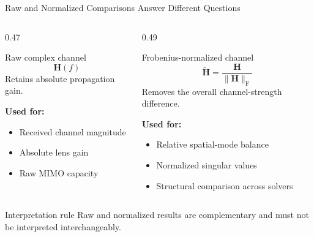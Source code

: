 \begin{frame}[t,shrink=20]{Raw and Normalized Comparisons Answer Different Questions}
    \begin{columns}[T,onlytextwidth]
        \begin{column}{0.47\textwidth}
            \begin{block}{Raw complex channel}
                \[
                    \mathbf H(f)
                \]
                Retains absolute propagation gain.

                \vspace{2mm}
                \textbf{Used for:}
                \begin{itemize}
                    \item Received channel magnitude
                    \item Absolute lens gain
                    \item Raw MIMO capacity
                \end{itemize}
            \end{block}
        \end{column}
        \begin{column}{0.49\textwidth}
            \begin{block}{Frobenius-normalized channel}
                \[
                    \widetilde{\mathbf H}
                    =\frac{\mathbf H}{\lVert\mathbf H\rVert_{\mathrm F}}
                \]
                Removes the overall channel-strength difference.

                \vspace{2mm}
                \textbf{Used for:}
                \begin{itemize}
                    \item Relative spatial-mode balance
                    \item Normalized singular values
                    \item Structural comparison across solvers
                \end{itemize}
            \end{block}
        \end{column}
    \end{columns}
    \begin{alertblock}{Interpretation rule}
        Raw and normalized results are complementary and must not be
        interpreted interchangeably.
    \end{alertblock}
\end{frame}

